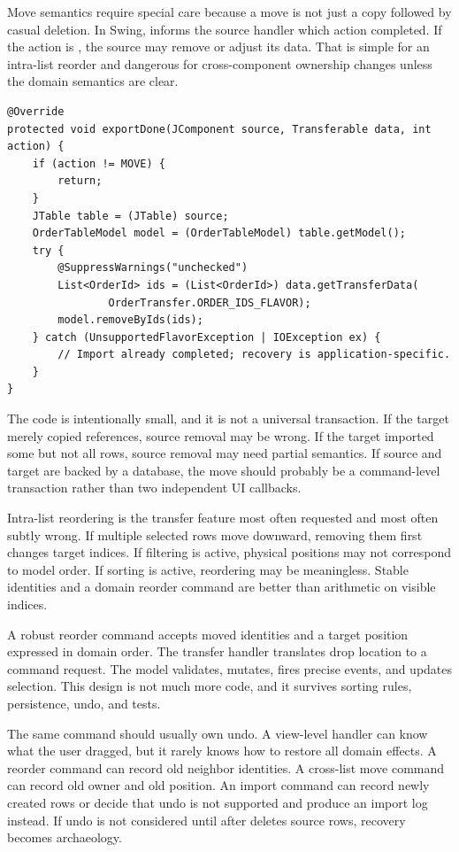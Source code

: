Move semantics require special care because a move is not just a copy followed by casual deletion. In Swing,  informs the source handler which action completed. If the action is , the source may remove or adjust its data. That is simple for an intra-list reorder and dangerous for cross-component ownership changes unless the domain semantics are clear.

\begin{lstlisting}[caption={Removing moved rows after a successful move.}]
@Override
protected void exportDone(JComponent source, Transferable data, int action) {
    if (action != MOVE) {
        return;
    }
    JTable table = (JTable) source;
    OrderTableModel model = (OrderTableModel) table.getModel();
    try {
        @SuppressWarnings("unchecked")
        List<OrderId> ids = (List<OrderId>) data.getTransferData(
                OrderTransfer.ORDER_IDS_FLAVOR);
        model.removeByIds(ids);
    } catch (UnsupportedFlavorException | IOException ex) {
        // Import already completed; recovery is application-specific.
    }
}
\end{lstlisting}

The code is intentionally small, and it is not a universal transaction. If the target merely copied references, source removal may be wrong. If the target imported some but not all rows, source removal may need partial semantics. If source and target are backed by a database, the move should probably be a command-level transaction rather than two independent UI callbacks.

Intra-list reordering is the transfer feature most often requested and most often subtly wrong. If multiple selected rows move downward, removing them first changes target indices. If filtering is active, physical positions may not correspond to model order. If sorting is active, reordering may be meaningless. Stable identities and a domain reorder command are better than arithmetic on visible indices.

A robust reorder command accepts moved identities and a target position expressed in domain order. The transfer handler translates drop location to a command request. The model validates, mutates, fires precise events, and updates selection. This design is not much more code, and it survives sorting rules, persistence, undo, and tests.

The same command should usually own undo. A view-level handler can know what the user dragged, but it rarely knows how to restore all domain effects. A reorder command can record old neighbor identities. A cross-list move command can record old owner and old position. An import command can record newly created rows or decide that undo is not supported and produce an import log instead. If undo is not considered until after  deletes source rows, recovery becomes archaeology.

